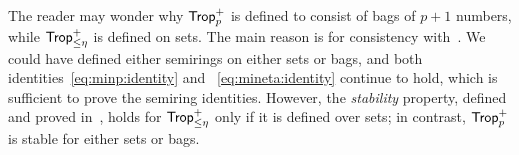 The reader may wonder why $\text{\sf Trop}^+_p$ is defined to consist of bags of
$p+1$ numbers, while $\text{\sf Trop}^+_{\leq \eta}$ is defined on sets.  The main
reason is for consistency with~\cite{semiring_book}.  We could have
defined either semirings on either sets or bags, and both
identities~\eqref{eq:minp:identity} and ~\eqref{eq:mineta:identity}
continue to hold, which is sufficient to prove the semiring
identities.  However, the {\em stability} property,
defined and proved in~\cite{DBLP:conf/pods/Khamis0PSW22}, holds for
$\text{\sf Trop}^+_{\leq \eta}$ only if it is defined over sets; in contrast,
$\text{\sf Trop}^+_p$ is stable for either sets or bags.




\section{\datalogo}
\label{sec:datalogo}

